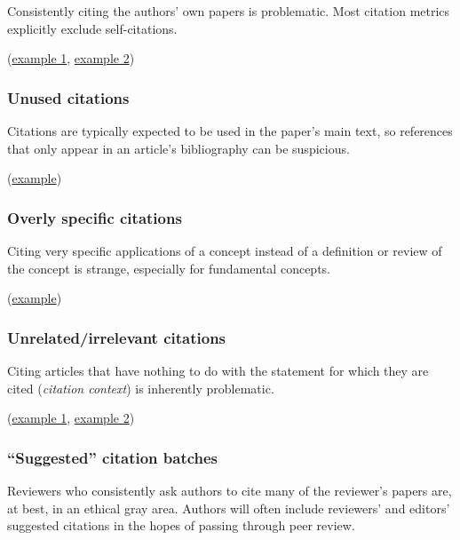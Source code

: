 \documentclass[letterpaper, 12pt]{article}
\begin{document}
Consistently citing the authors' own papers is problematic. Most citation metrics explicitly exclude self-citations.

(\href{https://pubpeer.com/publications/3EAC0C5735F8D48FF1D4B06C6BFC30}{example 1}, \href{https://pubpeer.com/publications/05FEFB3CB21AB7AE04EA800AAB28BF}{example 2})

\subsubsection*{Unused citations}

Citations are typically expected to be used in the paper's main text, so references that only appear in an article's bibliography can be suspicious.

(\href{https://pubpeer.com/publications/0C7E7F2703724338046FF2A0AA8392}{example})

\subsubsection*{Overly specific citations}

Citing very specific applications of a concept instead of a definition or review of the concept is strange, especially for fundamental concepts.

(\href{https://pubpeer.com/publications/5A064B2F4AE7F13D6E1F559F84492F}{example})

\subsubsection*{Unrelated/irrelevant citations}

Citing articles that have nothing to do with the statement for which they are cited (\emph{citation context}) is inherently problematic.

(\href{https://pubpeer.com/publications/B9CE2B145B02E439BA9C5B2C2D5F12}{example 1}, \href{https://pubpeer.com/publications/C21D670DD4C94B02C78809A55ED385}{example 2})

\subsubsection*{``Suggested'' citation batches}

Reviewers who consistently ask authors to cite many of the reviewer's papers are, at best, in an ethical gray area. Authors will often include reviewers' and editors' suggested citations in the hopes of passing through peer review.
\end{document}
